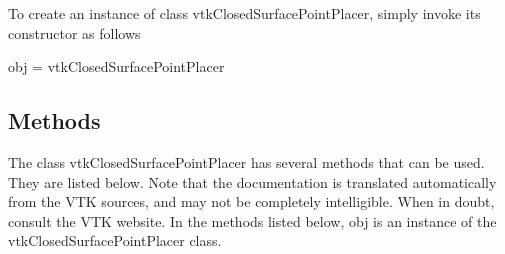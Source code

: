 To create an instance of class vtk\-Closed\-Surface\-Point\-Placer, simply invoke its constructor as follows \begin{DoxyVerb}  obj = vtkClosedSurfacePointPlacer
\end{DoxyVerb}
 \hypertarget{vtkwidgets_vtkxyplotwidget_Methods}{}\subsection{Methods}\label{vtkwidgets_vtkxyplotwidget_Methods}
The class vtk\-Closed\-Surface\-Point\-Placer has several methods that can be used. They are listed below. Note that the documentation is translated automatically from the V\-T\-K sources, and may not be completely intelligible. When in doubt, consult the V\-T\-K website. In the methods listed below, {\ttfamily obj} is an instance of the vtk\-Closed\-Surface\-Point\-Placer class. 
